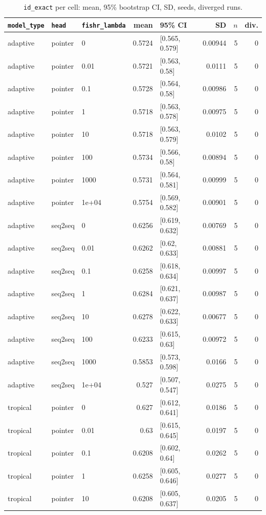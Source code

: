 \documentclass[10pt]{article}
\begin{document}
{\small
\begin{longtable}{lllrlrrr}
\caption{\texttt{id\_exact} per cell: mean, 95\% bootstrap CI, SD, seeds, diverged runs.}\label{tab:summary-id_exact}\\
\toprule
\texttt{model\_type} & \texttt{head} & \texttt{fishr\_lambda} & mean & 95\% CI & SD & $n$ & div.\\
\midrule
\endhead
adaptive & pointer & 0 & 0.5724 & [0.565, 0.579] & 0.00944 & 5 & 0\\
adaptive & pointer & 0.01 & 0.5721 & [0.563, 0.58] & 0.0111 & 5 & 0\\
adaptive & pointer & 0.1 & 0.5728 & [0.564, 0.58] & 0.00986 & 5 & 0\\
adaptive & pointer & 1 & 0.5718 & [0.563, 0.578] & 0.00975 & 5 & 0\\
adaptive & pointer & 10 & 0.5718 & [0.563, 0.579] & 0.0102 & 5 & 0\\
adaptive & pointer & 100 & 0.5734 & [0.566, 0.58] & 0.00894 & 5 & 0\\
adaptive & pointer & 1000 & 0.5731 & [0.564, 0.581] & 0.00999 & 5 & 0\\
adaptive & pointer & 1e+04 & 0.5754 & [0.569, 0.582] & 0.00901 & 5 & 0\\
adaptive & seq2seq & 0 & 0.6256 & [0.619, 0.632] & 0.00769 & 5 & 0\\
adaptive & seq2seq & 0.01 & 0.6262 & [0.62, 0.633] & 0.00881 & 5 & 0\\
adaptive & seq2seq & 0.1 & 0.6258 & [0.618, 0.634] & 0.00997 & 5 & 0\\
adaptive & seq2seq & 1 & 0.6284 & [0.621, 0.637] & 0.00987 & 5 & 0\\
adaptive & seq2seq & 10 & 0.6278 & [0.622, 0.633] & 0.00677 & 5 & 0\\
adaptive & seq2seq & 100 & 0.6233 & [0.615, 0.63] & 0.00972 & 5 & 0\\
adaptive & seq2seq & 1000 & 0.5853 & [0.573, 0.598] & 0.0166 & 5 & 0\\
adaptive & seq2seq & 1e+04 & 0.527 & [0.507, 0.547] & 0.0275 & 5 & 0\\
tropical & pointer & 0 & 0.627 & [0.612, 0.641] & 0.0186 & 5 & 0\\
tropical & pointer & 0.01 & 0.63 & [0.615, 0.645] & 0.0197 & 5 & 0\\
tropical & pointer & 0.1 & 0.6208 & [0.602, 0.64] & 0.0262 & 5 & 0\\
tropical & pointer & 1 & 0.6258 & [0.605, 0.646] & 0.0277 & 5 & 0\\
tropical & pointer & 10 & 0.6208 & [0.605, 0.637] & 0.0205 & 5 & 0\\

\end{longtable}}
\end{document}

